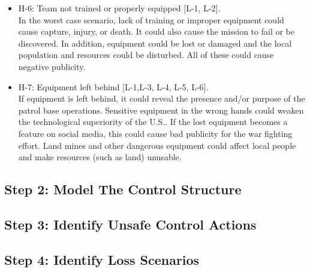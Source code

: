 \documentclass[../../main/main.tex]{subfiles}
\begin{document}
\begin{itemize}
\item H-6: Team not trained or properly equipped [L-1, L-2].\\
In the worst case scenario, lack of training or improper equipment could cause capture, injury, or death.  It could also cause the mission to fail or be discovered.  In addition, equipment could be lost or damaged and the local population and resources could be disturbed.  All of these could cause negative publicity.

\item H-7: Equipment left behind [L-1,L-3, L-4, L-5, L-6].\\
If equipment is left behind, it could reveal the presence and/or purpose of the patrol base operations.  Sensitive equipment in the wrong hands could weaken the technological superiority of the U.S.. If the lost equipment becomes a feature on social media, this could cause bad publicity for the war fighting effort.  Land mines and other dangerous equipment could affect local people and make resources (such as land) unusable.

\end{itemize}



\subsection{Step 2: Model The Control Structure}


\subsection{Step 3: Identify Unsafe Control Actions}
\subsection{Step 4: Identify Loss Scenarios}
\end{document}
